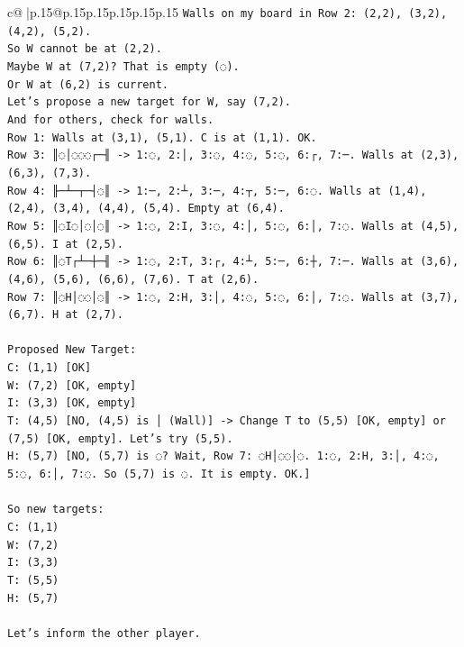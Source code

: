 \documentclass{article}
\begin{document}
{\begin{supertabular}{c@{$\;$}|p{.15\linewidth}@{}p{.15\linewidth}p{.15\linewidth}p{.15\linewidth}p{.15\linewidth}p{.15\linewidth}}
{{{\texttt{Walls on my board in Row 2: (2,2), (3,2), (4,2), (5,2).} \\
\texttt{So W cannot be at (2,2).} \\
\texttt{Maybe W at (7,2)? That is empty (◌).} \\
\texttt{Or W at (6,2) is current.} \\
\texttt{Let's propose a new target for W, say (7,2).} \\
\texttt{And for others, check for walls.} \\
\texttt{Row 1: Walls at (3,1), (5,1). C is at (1,1). OK.} \\
\texttt{Row 3: ║◌│◌◌◌┌─╢ {-}> 1:◌, 2:│, 3:◌, 4:◌, 5:◌, 6:┌, 7:─. Walls at (2,3), (6,3), (7,3).} \\
\texttt{Row 4: ╟─┴─┬─┤◌║ {-}> 1:─, 2:┴, 3:─, 4:┬, 5:─, 6:◌. Walls at (1,4), (2,4), (3,4), (4,4), (5,4). Empty at (6,4).} \\
\texttt{Row 5: ║◌I◌│◌│◌║ {-}> 1:◌, 2:I, 3:◌, 4:│, 5:◌, 6:│, 7:◌. Walls at (4,5), (6,5). I at (2,5).} \\
\texttt{Row 6: ║◌T┌┴─┼─╢ {-}> 1:◌, 2:T, 3:┌, 4:┴, 5:─, 6:┼, 7:─. Walls at (3,6), (4,6), (5,6), (6,6), (7,6). T at (2,6).} \\
\texttt{Row 7: ║◌H│◌◌│◌║ {-}> 1:◌, 2:H, 3:│, 4:◌, 5:◌, 6:│, 7:◌. Walls at (3,7), (6,7). H at (2,7).} \\
\\ 
\texttt{Proposed New Target:} \\
\texttt{C: (1,1) {[}OK{]}} \\
\texttt{W: (7,2) {[}OK, empty{]}} \\
\texttt{I: (3,3) {[}OK, empty{]}} \\
\texttt{T: (4,5) {[}NO, (4,5) is │ (Wall){]} {-}> Change T to (5,5) {[}OK, empty{]} or (7,5) {[}OK, empty{]}. Let's try (5,5).} \\
\texttt{H: (5,7) {[}NO, (5,7) is ◌? Wait, Row 7: ◌H│◌◌│◌. 1:◌, 2:H, 3:│, 4:◌, 5:◌, 6:│, 7:◌. So (5,7) is ◌. It is empty. OK.{]}} \\
\\ 
\texttt{So new targets:} \\
\texttt{C: (1,1)} \\
\texttt{W: (7,2)} \\
\texttt{I: (3,3)} \\
\texttt{T: (5,5)} \\
\texttt{H: (5,7)} \\
\\ 
\texttt{Let's inform the other player.} \\
}}}
\end{supertabular}}
\end{document}
